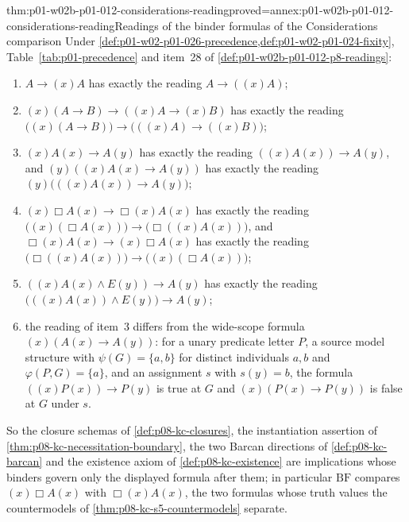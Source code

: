 \begin{hblemma}{thm:p01-w02b-p01-012-considerations-reading}{proved=annex:p01-w02b-p01-012-considerations-reading}{Readings of the binder formulas of the Considerations comparison}
Under \cref{def:p01-w02-p01-026-precedence,def:p01-w02-p01-024-fixity},
Table~\ref{tab:p01-precedence} and item~28 of
\cref{def:p01-w02b-p01-012-p8-readings}:
\begin{enumerate}
\item \(A\to(x)A\) has exactly the reading \(A\to((x)A)\);
\item \((x)(A\to B)\to((x)A\to(x)B)\) has exactly the reading
  \(\bigl((x)(A\to B)\bigr)\to\bigl(((x)A)\to((x)B)\bigr)\);
\item \((x)A(x)\to A(y)\) has exactly the reading
  \(((x)A(x))\to A(y)\), and \((y)((x)A(x)\to A(y))\) has exactly the
  reading \((y)\bigl(((x)A(x))\to A(y)\bigr)\);
\item \((x)\Box A(x)\to\Box(x)A(x)\) has exactly the reading
  \(\bigl((x)(\Box A(x))\bigr)\to\bigl(\Box((x)A(x))\bigr)\), and
  \(\Box(x)A(x)\to(x)\Box A(x)\) has exactly the reading
  \(\bigl(\Box((x)A(x))\bigr)\to\bigl((x)(\Box A(x))\bigr)\);
\item \(((x)A(x)\land E(y))\to A(y)\) has exactly the reading
  \(\bigl(((x)A(x))\land E(y)\bigr)\to A(y)\);
\item the reading of item~3 differs from the wide-scope formula
  \((x)(A(x)\to A(y))\): for a unary predicate letter \(P\), a source
  model structure with \(\psi(G)=\{a,b\}\) for distinct individuals
  \(a,b\) and \(\varphi(P,G)=\{a\}\), and an assignment \(s\) with
  \(s(y)=b\), the formula \(((x)P(x))\to P(y)\) is true at \(G\) and
  \((x)(P(x)\to P(y))\) is false at \(G\) under \(s\).
\end{enumerate}
So the closure schemas of \cref{def:p08-kc-closures}, the instantiation
assertion of \cref{thm:p08-kc-necessitation-boundary}, the two Barcan
directions of \cref{def:p08-kc-barcan} and the existence axiom of
\cref{def:p08-kc-existence} are implications whose binders govern only the
displayed formula after them; in particular \(\mathrm{BF}\) compares
\((x)\Box A(x)\) with \(\Box(x)A(x)\), the two formulas whose truth values
the countermodels of \cref{thm:p08-kc-s5-countermodels} separate.
\end{hblemma}

